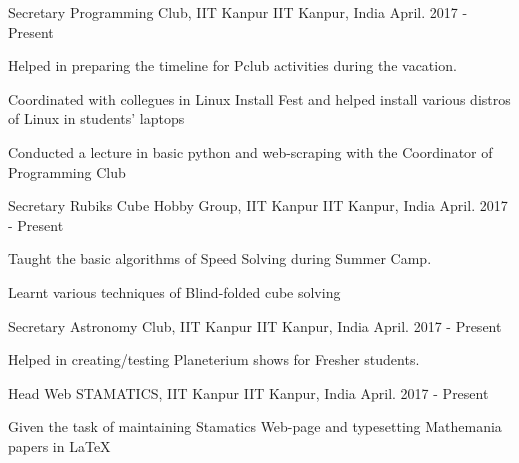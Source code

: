 \begin{cventries}
  \cventry
    {Secretary }
    {Programming Club, IIT Kanpur}
    {IIT Kanpur, India}
    {April. 2017 - Present}
    {
      \begin{cvitems}
        \item {Helped in preparing the timeline for Pclub activities during the  vacation.}
		\item {Coordinated with collegues in Linux Install Fest and helped install various distros of Linux in students' laptops}
		\item {Conducted a lecture in basic python and web-scraping with the Coordinator of Programming Club}
      \end{cvitems}
    }

  \cventry
    {Secretary }
    {Rubiks Cube Hobby Group, IIT Kanpur}
    {IIT Kanpur, India}
    {April. 2017 - Present}
    {
      \begin{cvitems}
        \item {Taught the basic algorithms of Speed Solving during Summer Camp. }
		\item {Learnt various techniques of Blind-folded cube solving}
      \end{cvitems}
    }

  \cventry
    {Secretary }
    {Astronomy Club, IIT Kanpur}
    {IIT Kanpur, India}
    {April. 2017 - Present}
    {
      \begin{cvitems}
        \item {Helped in creating/testing Planeterium shows for Fresher students.}
      \end{cvitems}
    }
  \cventry
    {Head Web }
    {STAMATICS, IIT Kanpur}
    {IIT Kanpur, India}
    {April. 2017 - Present}
    {
      \begin{cvitems}
        \item {Given the task of maintaining Stamatics Web-page and typesetting Mathemania papers in \LaTeX}
      \end{cvitems}
    }
\end{cventries}
